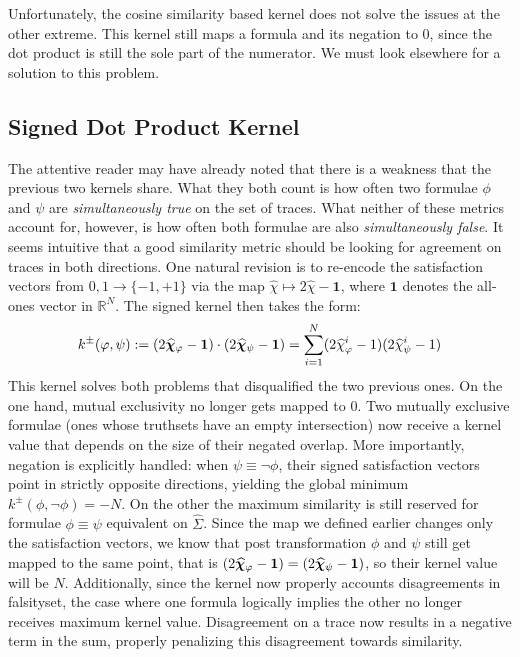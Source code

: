\documentclass[titlepage,a4paper,11pt]{report}
\begin{document}
    Unfortunately, the cosine similarity based kernel does not solve the issues at the other extreme. This kernel still maps a formula and its negation to $0$, since the dot product is still the sole part of the numerator. We must look elsewhere for a solution to this problem.

    \subsection{Signed Dot Product Kernel}\label{sec:signed_dot_product_kernel}
    The attentive reader may have already noted that there is a weakness that the previous two kernels share. What they both count is how often two formulae $\phi$ and $\psi$ are \emph{simultaneously true} on the set of traces. What neither of these metrics account for, however, is how often both formulae are also \emph{simultaneously false}. It seems intuitive that a good similarity metric should be looking for agreement on traces in both directions. One natural revision is to re-encode the satisfaction vectors from ${0,1} \to \{-1,+1\}$ via the map $\widehat\chi \mapsto 2\widehat\chi - \mathbf{1}$, where $\mathbf{1}$ denotes the all-ones vector in $\mathbb{R}^N$. The signed kernel then takes the form:
    \begin{equation}\label{eq:pm_kernel}
        k^\pm(\varphi, \psi) := (2\bm{\widehat\chi}_\varphi - \mathbf{1}) \cdot (2\bm{\widehat\chi}_\psi - \mathbf{1}) = \sum^N_{i=1} (2 \widehat \chi^i_{\varphi} - 1) (2 \widehat \chi^i_{\psi} - 1)
    \end{equation}
    This kernel solves both problems that disqualified the two previous ones. On the one hand, mutual exclusivity no longer gets mapped to $0$. Two mutually exclusive formulae (ones whose truthsets have an empty intersection) now receive a kernel value that depends on the size of their negated overlap. More importantly, negation is explicitly handled: when $\psi \equiv \neg\phi$, their signed satisfaction vectors point in strictly opposite directions, yielding the global minimum $k^\pm(\phi, \neg\phi) = -N$. On the other the maximum similarity is still reserved for formulae $\phi \equiv \psi$ equivalent on $\widehat \Sigma$. Since the map we defined earlier changes only the satisfaction vectors, we know that post transformation $\phi$ and $\psi$ still get mapped to the same point, that is $(2\bm{\widehat\chi}_\varphi - \mathbf{1}) = (2\bm{\widehat\chi}_\psi - \mathbf{1})$, so their kernel value will be $N$. Additionally, since the kernel now properly accounts disagreements in falsityset, the case where one formula logically implies the other no longer receives maximum kernel value. Disagreement on a trace now results in a negative term in the sum, properly penalizing this disagreement towards similarity. 
\end{document}
